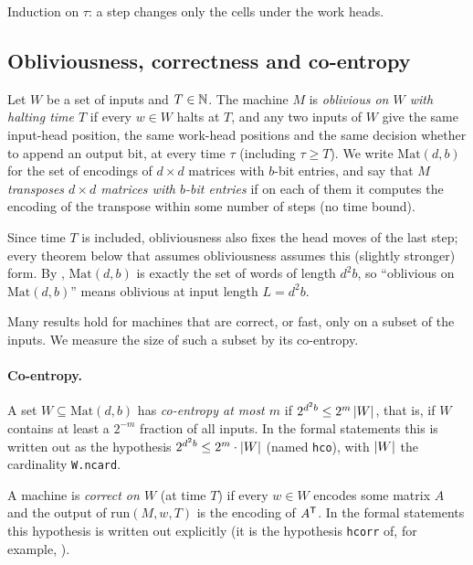 \begin{outline}
Induction on $\tau$: a step changes only the cells under the work heads.
\end{outline}

\subsection{Obliviousness, correctness and co-entropy}\label{sec:obl}

\begin{definition}\label{def:obl}
Let $W$ be a set of inputs and $T\in\mathbb{N}$. The machine $M$ is \emph{oblivious on $W$ with halting
time $T$} if every $w\in W$ halts at $T$, and any two inputs of $W$ give the same input-head
position, the same work-head positions and the same decision whether to append an output bit, at
every time $\tau$ (including $\tau\ge T$). We write $\mathrm{Mat}(d,b)$ for the set of encodings of
$d\times d$ matrices with $b$-bit entries, and say that $M$ \emph{transposes $d\times d$ matrices
with $b$-bit entries} if on each of them it computes the encoding of the transpose within some
number of steps (no time bound).
\end{definition}

Since time $T$ is included, obliviousness also fixes the head moves of the last step; every
theorem below that assumes obliviousness assumes this (slightly stronger) form. By
, $\mathrm{Mat}(d,b)$ is exactly the set of words of length $d^2b$, so
``oblivious on $\mathrm{Mat}(d,b)$'' means oblivious at input length $L=d^2b$.

Many results hold for machines that are correct, or fast, only on a subset of the inputs. We
measure the size of such a subset by its co-entropy.

\paragraph{Co-entropy.}\label{def:coent} A set $W\subseteq\mathrm{Mat}(d,b)$ has \emph{co-entropy at most $m$} if
$2^{d^2b}\le 2^m\,\lvert W \rvert$, that is, if $W$ contains at least a $2^{-m}$ fraction of all inputs. In the formal
statements this is written out as the hypothesis $2^{d^2b}\le2^m\cdot\lvert W \rvert$ (named \texttt{hco}), with
$\lvert W \rvert$ the cardinality \texttt{W.ncard}.

A machine is \emph{correct on $W$} (at time $T$) if every $w\in W$ encodes some matrix $A$ and the
output of $\mathrm{run}(M,w,T)$ is the encoding of $A^{\mathsf{T}}$. In the formal statements this
hypothesis is written out explicitly (it is the hypothesis \texttt{hcorr} of, for example,
).

